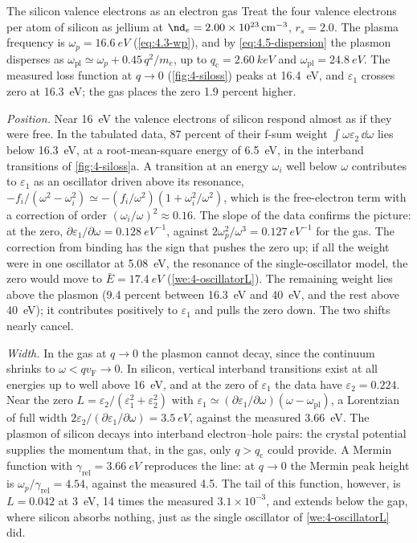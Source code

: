 \begin{workedexample}{The silicon valence electrons as an electron gas}\label{we:4-siplasmon}
Treat the four valence electrons per atom of silicon as jellium at $\nd_e = \SI{2.00e23}{cm^{-3}}$, $r_s = 2.0$. The plasma frequency is $\omega_p = \SI{16.6}{eV}$ (\cref{eq:4.3-wp}), and by \cref{eq:4.5-dispersion} the plasmon disperses as $\omega_{\mathrm{pl}} \simeq \omega_p + 0.45\,q^2/m_e$, up to $q_{\mathrm{c}} = \SI{2.60}{keV}$ and $\omega_{\mathrm{pl}} = \SI{24.8}{eV}$. The measured loss function at $q \to 0$ (\cref{fig:4-siloss}) peaks at \SI{16.4}{eV}, and $\varepsilon_1$ crosses zero at \SI{16.3}{eV}; the gas places the zero 1.9 percent higher.

\emph{Position.} Near \SI{16}{eV} the valence electrons of silicon respond almost as if they were free. In the tabulated data, 87 percent of their f-sum weight $\int\omega\varepsilon_2\,\dd\omega$ lies below \SI{16.3}{eV}, at a root-mean-square energy of \SI{6.5}{eV}, in the interband transitions of \cref{fig:4-siloss}a. A transition at an energy $\omega_i$ well below $\omega$ contributes to $\varepsilon_1$ as an oscillator driven above its resonance, $-f_i/(\omega^2 - \omega_i^2) \simeq -(f_i/\omega^2)(1 + \omega_i^2/\omega^2)$, which is the free-electron term with a correction of order $(\omega_i/\omega)^2 \approx 0.16$. The slope of the data confirms the picture: at the zero, $\partial\varepsilon_1/\partial\omega = \SI{0.128}{eV^{-1}}$, against $2\omega_p^2/\omega^3 = \SI{0.127}{eV^{-1}}$ for the gas. The correction from binding has the sign that pushes the zero up; if all the weight were in one oscillator at \SI{5.08}{eV}, the resonance of the single-oscillator model, the zero would move to $\bar E = \SI{17.4}{eV}$ (\cref{we:4-oscillatorL}). The remaining weight lies above the plasmon (9.4 percent between \SI{16.3}{eV} and \SI{40}{eV}, and the rest above \SI{40}{eV}); it contributes positively to $\varepsilon_1$ and pulls the zero down. The two shifts nearly cancel.

\emph{Width.} In the gas at $q \to 0$ the plasmon cannot decay, since the continuum shrinks to $\omega < qv_{\mathrm{F}} \to 0$. In silicon, vertical interband transitions exist at all energies up to well above \SI{16}{eV}, and at the zero of $\varepsilon_1$ the data have $\varepsilon_2 = 0.224$. Near the zero $L = \varepsilon_2/(\varepsilon_1^2 + \varepsilon_2^2)$ with $\varepsilon_1 \simeq (\partial\varepsilon_1/\partial\omega)(\omega - \omega_{\mathrm{pl}})$, a Lorentzian of full width $2\varepsilon_2/(\partial\varepsilon_1/\partial\omega) = \SI{3.5}{eV}$, against the measured \SI{3.66}{eV}. The plasmon of silicon decays into interband electron--hole pairs: the crystal potential supplies the momentum that, in the gas, only $q > q_{\mathrm{c}}$ could provide. A Mermin function with $\gamma_{\mathrm{rel}} = \SI{3.66}{eV}$ reproduces the line: at $q \to 0$ the Mermin peak height is $\omega_p/\gamma_{\mathrm{rel}} = 4.54$, against the measured 4.5. The tail of this function, however, is $L = 0.042$ at \SI{3}{eV}, 14 times the measured $3.1\times10^{-3}$, and extends below the gap, where silicon absorbs nothing, just as the single oscillator of \cref{we:4-oscillatorL} did.


\end{workedexample}

